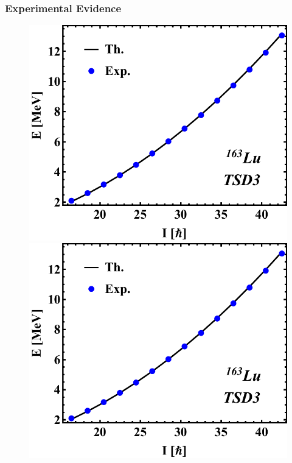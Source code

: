 \documentclass{beamer}
\begin{document}
\begin{frame}
  \frametitle{Experimental Evidence}
  \begin{figure}
    \centering
    \begin{minipage}{.5\textwidth}
      \centering
      \includegraphics[scale=0.3]{figs/DoubleShift_TSD3.pdf}
      \includegraphics[scale=0.3]{figs/DoubleShift_TSD3.pdf}
    \end{minipage}%
    \begin{minipage}{.5\textwidth}
      \centering

\end{minipage}
\end{figure}
\end{frame}
\end{document}
